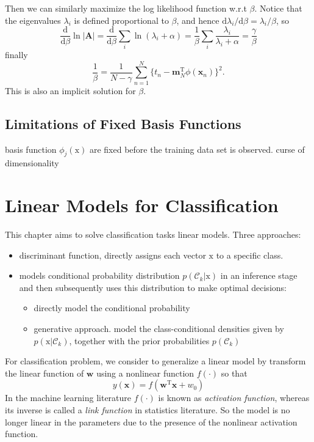 \documentclass[a4paper]{book}
\newcommand{\mrm}{\mathrm}
\newcommand{\mbf}{\mathbf}
\newcommand{\ud}{\mathrm{d}}
\newcommand{\ww}{\mbf w}
\newcommand{\mm}{\mbf m}
\newcommand{\xx}{\mbf x}
\newcommand{\trans}{^{\mrm T}}
\begin{document}
Then we can similarly maximize the log likelihood function w.r.t $\beta$. Notice that the eigenvalues $\lambda_i$ is defined proportional to $\beta$, and hence $\ud\lambda_i/\ud\beta=\lambda_i/\beta$, so
\begin{equation}\label{}
  \frac{\ud}{\ud \beta}\ln|\mbf A|=\frac{\ud}{\ud\beta}\sum_i\ln(\lambda_i+\alpha)=\frac{1}{\beta}\sum_i\frac{\lambda_i}{\lambda_i+\alpha}=\frac{\gamma}{\beta}
\end{equation}
finally
\begin{equation}\label{}
    \frac{1}{\beta} = \frac{1}{N-\gamma}\sum_{n=1}^{N}\{t_n-\mm_N\trans\phi(\xx_n)\}^2.
\end{equation}
This is also an implicit solution for $\beta$.

\subsection{Limitations of Fixed Basis Functions}
basis function $\phi_j(\mathrm x)$ are fixed before the training data set is observed.\newline
curse of dimensionality




\section{Linear Models for Classification}
This chapter aims to solve classification tasks linear models.\newline
Three approaches:
\begin{itemize}
  \item discriminant function, directly assigns each vector $\mathrm x$ to a specific class.
  \item models conditional probability distribution $p(\mathcal C_k|\mathrm x)$ in an inference stage and then subsequently uses this distribution to make optimal decisions:
      \begin{itemize}
        \item directly model the conditional probability
        \item generative approach. model the class-conditional densities given by $p(\mathrm x|\mathcal C_k)$, together with the prior probabilities $p(\mathcal C_k)$
      \end{itemize}
\end{itemize}

For classification problem, we consider to generalize a linear model by transform the linear function of $\ww$ using a nonlinear  function $f(\cdot)$ so that
\begin{equation}\label{}
  y(\xx) = f(\ww\trans\xx+w_0)
\end{equation}
In the machine learning literature $f(\cdot)$ is known as \textit{activation function}, whereas its inverse is called a \textit{link function} in statistics literature. So the model is no longer linear in the parameters due to the presence of the nonlinear activation function.
\end{document}
